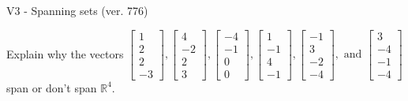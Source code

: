 \begin{exercise}
  \begin{exerciseTitle}V3 - Spanning sets (ver. 776)\end{exerciseTitle}
  \begin{exerciseStatement}
    Explain why the vectors \(\left[\begin{array}{r}
1 \\
2 \\
2 \\
-3
\end{array}\right] , \left[\begin{array}{r}
4 \\
-2 \\
2 \\
3
\end{array}\right] , \left[\begin{array}{r}
-4 \\
-1 \\
0 \\
0
\end{array}\right] , \left[\begin{array}{r}
1 \\
-1 \\
4 \\
-1
\end{array}\right] , \left[\begin{array}{r}
-1 \\
3 \\
-2 \\
-4
\end{array}\right] , \text{ and } \left[\begin{array}{r}
3 \\
-4 \\
-1 \\
-4
\end{array}\right]\) span or don't span \(\mathbb{R}^4\). 
	



\end{exerciseStatement}
\end{exercise}
